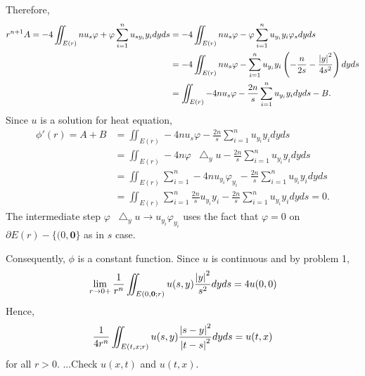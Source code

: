 \documentclass{article}
\newcommand*\Laplace{\mathop{}\!\mathbin\bigtriangleup}
\begin{document}
Therefore,
\begin{equation*}
\begin{split}
r^{n+1}A=-4\iint_{E(r)} nu_s\varphi + \varphi\sum\limits_{i=1}^n u_{sy_i} y_i  dyds &= -4\iint_{E(r)} nu_s\varphi - \varphi\sum\limits_{i=1}^n u_{y_i} y_i \varphi_s dyds \\
&=-4\iint_{E(r)} nu_s\varphi - \sum\limits_{i=1}^n u_{y_i} y_i \left(-\frac{n}{2s}-\frac{\abs{y}^2}{4s^2}\right) dyds \\
&=\iint_{E(r)} -4nu_s\varphi - \frac{2n}{s}\sum\limits_{i=1}^n u_{y_i} y_i dyds - B.
\end{split}
\end{equation*}
Since $u$ is a solution for heat equation,
\begin{equation*}
\begin{split}
\phi'(r)=A+B&=\iint_{E(r)} -4nu_s\varphi - \frac{2n}{s}\sum\limits_{i=1}^n u_{y_i} y_i dyds \\
&=\iint_{E(r)} -4n\varphi\Laplace_y u - \frac{2n}{s}\sum\limits_{i=1}^n u_{y_i} y_i dyds \\
&=\iint_{E(r)} \sum\limits_{i=1}^n-4n u_{y_i}\varphi_{y_i} - \frac{2n}{s}\sum\limits_{i=1}^n u_{y_i} y_i dyds \\
&=\iint_{E(r)} \sum\limits_{i=1}^n\frac{2n}{s} u_{y_i}y_i - \frac{2n}{s}\sum\limits_{i=1}^n u_{y_i} y_i dyds = 0.
\end{split}
\end{equation*}
The intermediate step $\varphi\Laplace_y u \rightarrow u_{y_i}\varphi_{y_i}$ uses the fact that $\varphi=0$ on $\partial E(r)-\{(0, \bm{0}\}$ as in $s$ case.

Consequently, $\phi$ is a constant function. Since $u$ is continuous and by problem 1,
\begin{equation*}
\lim\limits_{r\rightarrow 0+}\frac{1}{r^n}\iint_{E(0,\bm{0};r)}u(s,y)\frac{\abs{y}^2}{s^2}dyds =4u(0,0) 
\end{equation*}
Hence, 
\begin{equation*}
\frac{1}{4r^n}\iint_{E(t,x;r)}u(s,y)\frac{\abs{s-y}^2}{\abs{t-s}^2}dyds = u(t,x)
\end{equation*}
for all $r>0$.
...Check $u(x,t)$ and $u(t,x)$.
\end{document}
